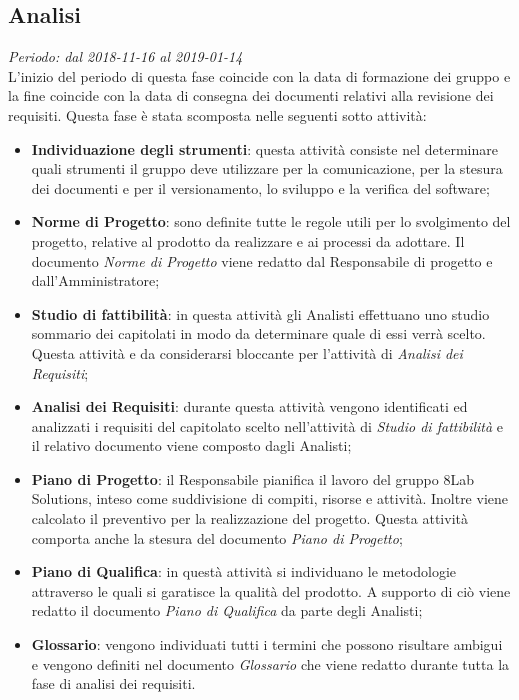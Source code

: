 \subsection{Analisi}
\textit{Periodo: dal 2018-11-16 al 2019-01-14}\\
L'inizio del periodo di questa fase coincide con la data di formazione dei 
gruppo e la fine coincide con la data di consegna dei documenti relativi alla 
revisione dei requisiti. Questa fase è stata scomposta nelle seguenti sotto attività:
\begin{itemize}
	\item \textbf{Individuazione degli strumenti}: questa attività consiste nel 
	determinare quali strumenti il gruppo deve utilizzare per la comunicazione, per 
la stesura dei documenti e per il versionamento, lo sviluppo e la verifica del 
software; 
	\item \textbf{Norme di Progetto}: sono definite tutte le regole utili per lo svolgimento del progetto, relative al prodotto da realizzare e ai processi da adottare. Il documento \textit{Norme di Progetto} viene redatto dal Responsabile di progetto e dall'Amministratore;
	\item \textbf{Studio di fattibilità}: in questa attività gli Analisti effettuano uno studio sommario dei capitolati in modo da determinare quale di essi verrà scelto. Questa attività e da considerarsi bloccante per l'attività di \textit{Analisi dei Requisiti};
	\item \textbf{Analisi dei Requisiti}: durante questa attività vengono 
	identificati ed analizzati i requisiti del capitolato scelto nell'attività 
	di \textit{Studio di fattibilità} e il relativo documento viene composto dagli Analisti;
	\item \textbf{Piano di Progetto}: il Responsabile pianifica il 
	lavoro del gruppo 8Lab Solutions, inteso come suddivisione di compiti, 
	risorse e attività. Inoltre viene calcolato il preventivo per la realizzazione 
	del progetto. Questa attività comporta anche la stesura 
	del documento \textit{Piano di Progetto};
	\item \textbf{Piano di Qualifica}: in questà attività si individuano le 
	metodologie attraverso le quali si garatisce la qualità del prodotto. A supporto di ciò viene redatto il documento \textit{Piano di Qualifica} da parte degli Analisti; 
	\item \textbf{Glossario}: vengono individuati tutti i termini che possono risultare ambigui e 
	vengono definiti nel documento \textit{Glossario} che viene 
	redatto durante tutta la fase di analisi dei requisiti.
\end{itemize}


